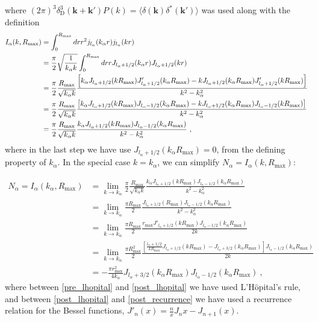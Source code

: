 where $(2 \pi)^3 \delta^3_\text{D}( \mathbf{k} + \mathbf{k}') P(k) =  \langle \delta(\mathbf{k}) \delta^*(\mathbf{k}') \rangle$ was used along with the definition 
\begin{align} 
\begin{split} 
I_\alpha(k,  R_\text{max}) & =  \int_0^{R_\text{max}}dr r^2 j_{l_\alpha}(k_\alpha r) j_{l_\alpha}( k r) \\
& = \frac{\pi}{2} \sqrt{ \frac{1}{k _ \alpha k}} \int_0^{R_\text{max}}dr r J_{l_\alpha+ 1/2}(k_\alpha r)  J_{l_\alpha+ 1/2}( k r) \\
& = \frac{\pi}{2} \frac{ R_\text{max}}{ \sqrt{ k _ \alpha k}}\frac{\left[k_\alpha J_{l_\alpha+ 1/2}( k  R_\text{max})J_{l_\alpha+ 1/2}'(k_\alpha  R_\text{max}) - k J_{l_\alpha+ 1/2}(k_\alpha  R_\text{max})J_{l_\alpha+ 1/2}'(k  R_\text{max})\right]}{k^2 - k_\alpha^2}\\
& = \frac{\pi}{2} \frac{ R_\text{max}}{ \sqrt{ k _ \alpha k}}\frac{\left[k_\alpha J_{l_\alpha+ 1/2}( k  R_\text{max})J_{l_\alpha- 1/2}(k_\alpha  R_\text{max}) - k J_{l_\alpha+ 1/2}(k_\alpha  R_\text{max})J_{l_\alpha- 1/2}(k  R_\text{max})\right]}{k^2 - k_\alpha^2}\\
& = \frac{\pi}{2} \frac{ R_\text{max}}{ \sqrt{ k _ \alpha k}}\frac{k_\alpha J_{l_\alpha+ 1/2}( k  R_{\text{max}})J_{l_\alpha- 1/2}(k_\alpha  R_\text{max})}{k^2 - k_\alpha^2}~,
\end{split} 
\end{align}
where in the last step we have use $J_{l_\alpha+1/2}(k_\alpha R_\text{max})=0$, from the defining property of $k_\alpha$. In the special case $k=k_\alpha$, we can simplify $N_\alpha = I_\alpha(k,R_\text{max})$:

\begin{align}
N_\alpha = I_\alpha(k_\alpha,  R_\text{max}) & = \lim_{k\to k_\alpha} \frac{\pi}{2} \frac{ R_\text{max}}{ \sqrt{ k _ \alpha k}}\frac{k_\alpha J_{l_\alpha+ 1/2}( k  R_\text{max})J_{l_\alpha- 1/2}(k_\alpha  R_\text{max})}{k^2 - k_\alpha^2}\\
&=\lim_{k\to k_\alpha}\frac{\pi R_\text{max}}{2} \frac{J_{l_\alpha+ 1/2}( R_\text{max})J_{l_\alpha- 1/2}(k_\alpha  R_\text{max})}{k^2 - k_\alpha^2}\label{pre_lhopital}\\
&=\lim_{k\to k_\alpha}\frac{\pi R_\text{max}}{2} \frac{r_\text{max}J'_{l_\alpha+ 1/2}(k R_\text{max})J_{l_\alpha- 1/2}(k_\alpha  R_\text{max})}{2 k}\label{post_lhopital}\\
&=\lim_{k\to k_\alpha}\frac{\pi R_\text{max}^2}{2} \frac{\left[\frac{l_\alpha+1/2}{k R_{\text{max}}}J_{l_\alpha+1/2}(k R_\text{max})-J_{l_\alpha+3/2}(k_\alpha R_\text{max})\right]J_{l_\alpha- 1/2}(k_\alpha  R_\text{max})}{2 k}\label{post_recurrence}\\
&=-\frac{\pi r_\text{max}^2}{4 k_\alpha}J_{l_\alpha+3/2}(k_\alpha{R_\text{max}})J_{l_\alpha- 1/2}(k_\alpha  R_\text{max})\label{norm_final} ~,
\end{align}
where between \eqref{pre_lhopital} and \eqref{post_lhopital} we have used L'H$\hat{\text{o}}$pital's rule, and between \eqref{post_lhopital} and \eqref{post_recurrence} we have used a recurrence relation for the Bessel functions, $J'_n(x)=\frac{n}{x}J_n{x}-J_{n+1}(x)$.

%  
